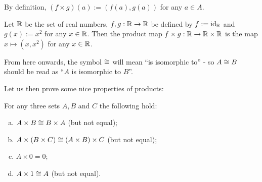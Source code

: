 By definition, $(f\times g)(a):=(f(a),g(a))$ for any $a\in A$.

\begin{ex}
	Let $\mathbb R$ be the set of real numbers, $f,g:\mathbb R\to \mathbb R$ be defined by $f:={\rm id}_\mathbb R$ and $g(x):=x^2$ for any $x\in\mathbb R$. Then the product map $f\times g:\mathbb R\to\mathbb R\times \mathbb R$ is the map $x\mapsto(x,x^2)$ for any $x\in \mathbb R$.
\end{ex}

\begin{rmk}
	From here onwards, the symbol $\cong$ will mean ``is isomorphic to'' - so $A\cong B$ should be read as ``$A$ is isomorphic to $B$''.
\end{rmk}

Let us then prove some nice properties of products:

\begin{lemma}
		For any three sets $A,B$ and $C$ the following hold:
	\begin{enumerate}[(a)]
		\item $A\times B\cong B\times A$ (but not equal);
		\item $A\times(B\times C)\cong (A\times B)\times C$ (but not equal);
		\item $A\times 0=0$;
		\item $A\times 1\cong A$ (but not equal).
	\end{enumerate}
\end{lemma}
